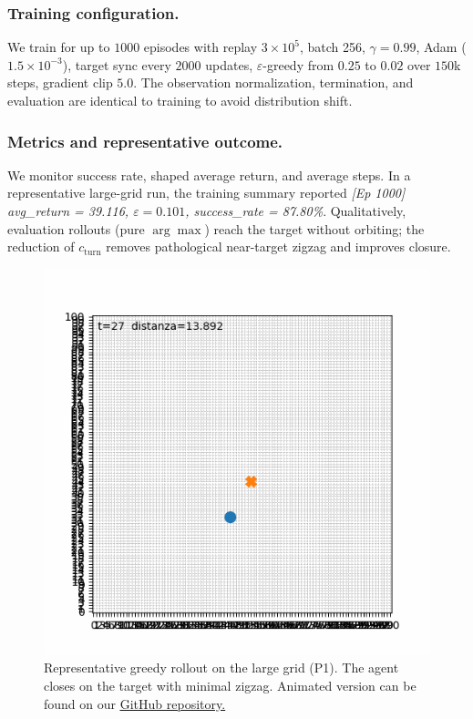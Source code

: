         \subsubsection{Training configuration.}
            We train for up to $1000$ episodes with replay $3\!\times\!10^5$, batch 256, $\gamma=0.99$, Adam ($1.5\!\times\!10^{-3}$), target sync every $2000$ updates, $\varepsilon$-greedy from $0.25$ to $0.02$ over $150$k steps, gradient clip $5.0$.
            The observation normalization, termination, and evaluation are identical to training to avoid distribution shift.

        \subsubsection{Metrics and representative outcome.}
            We monitor success rate, shaped average return, and average steps. In a representative large-grid run, the training summary reported
            \emph{[Ep 1000] avg\_return = 39.116, $\varepsilon=0.101$, success\_rate = 87.80\%}.%
            Qualitatively, evaluation rollouts (pure $\arg\max$) reach the target without orbiting; the reduction of $c_{\mathrm{turn}}$ removes pathological near-target zigzag and improves closure.

            \begin{figure}[H]
                \centering
                \includegraphics[scale=0.5]{Figures/step_2_t2.png}
                \caption{Representative greedy rollout on the large grid (P1). The agent closes on the target with minimal zigzag. Animated version can be found on our \underline{\href{https://github.com/rolandoinnamorati/swarm-rl}{GitHub repository.}}}
            \end{figure}
